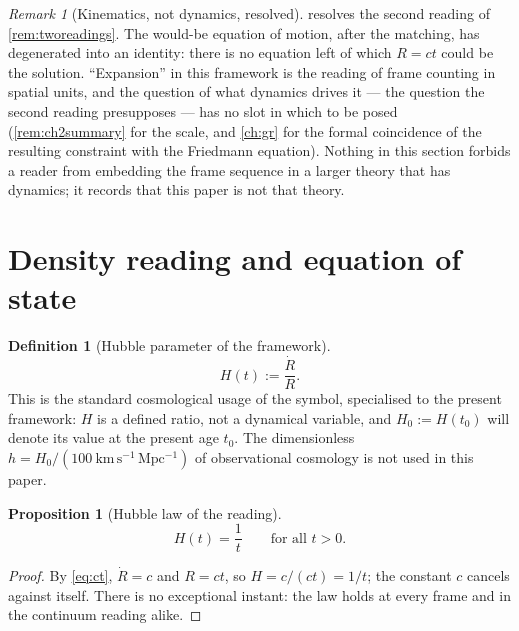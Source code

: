 \documentclass[11pt]{amsbook}
\theoremstyle{plain}
\newtheorem{proposition}[theorem]{Proposition}
\theoremstyle{definition}
\newtheorem{definition}[theorem]{Definition}
\theoremstyle{remark}
\newtheorem{remark}[theorem]{Remark}
\newcommand{\uses}[1]{\par\nopagebreak\noindent{\footnotesize\emph{Uses: #1.}\par}}
\begin{document}
\begin{remark}[Kinematics, not dynamics, resolved]\label{rem:resolved}
 resolves the second reading of \cref{rem:tworeadings}. The would-be equation of motion, after the matching, has degenerated into an identity: there is no equation left of which $R = ct$ could be the solution. ``Expansion'' in this framework is the reading of frame counting in spatial units, and the question of what dynamics drives it --- the question the second reading presupposes --- has no slot in which to be posed (\cref{rem:ch2summary} for the scale, and \cref{ch:gr} for the formal coincidence of the resulting constraint with the Friedmann equation). Nothing in this section forbids a reader from embedding the frame sequence in a larger theory that has dynamics; it records that this paper is not that theory.
\end{remark}

\section{Density reading and equation of state}\label{sec:density-readout}

\begin{definition}[Hubble parameter of the framework]\label{def:hubble}
\begin{equation}\label{eq:hubble}
H(t) := \frac{\dot R}{R}.
\end{equation}
This is the standard cosmological usage of the symbol, specialised to the present framework: $H$ is a defined ratio, not a dynamical variable, and $H_{0} := H(t_{0})$ will denote its value at the present age $t_{0}$. The dimensionless $h = H_{0} / (100\ \mathrm{km\,s^{-1}\,Mpc^{-1}})$ of observational cosmology is not used in this paper.
\end{definition}

\begin{proposition}[Hubble law of the reading]\label{prop:hubblelaw}
\begin{equation}\label{eq:hubblelaw}
H(t) = \frac{1}{t} \qquad \text{for all } t > 0.
\end{equation}
\uses{\cref{eq:ct}, \cref{def:hubble}}
\end{proposition}

\begin{proof}
By \cref{eq:ct}, $\dot R = c$ and $R = ct$, so $H = c / (ct) = 1/t$; the constant $c$ cancels against itself. There is no exceptional instant: the law holds at every frame and in the continuum reading alike.
\end{proof}
\end{document}
